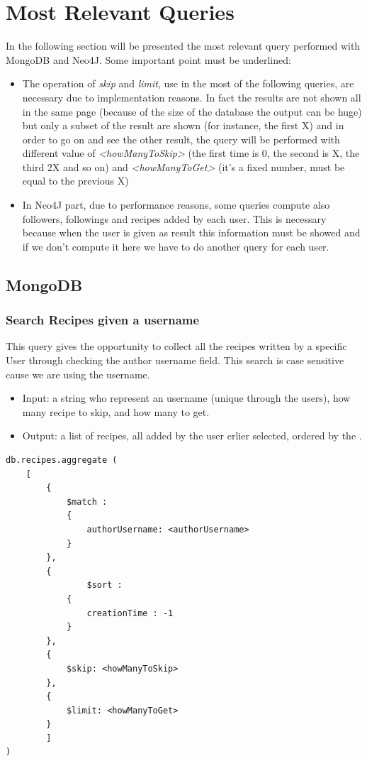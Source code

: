 \documentclass[a4paper]{report}
\begin{document}
\section{Most Relevant Queries}
In the following section will be presented the most relevant query performed with MongoDB and Neo4J. 
\noindent Some important point must be underlined:
\begin{itemize}
	\item The operation of \emph{skip} and \emph{limit}, use in the most of the following queries, are necessary due  to implementation reasons. In fact the results are not shown all in the same page (because of the size of the database the output can be huge) but only a subset of the result are shown (for instance, the first X) and in order to go on and see the other result, the query will be performed with different value of \emph{<howManyToSkip>} (the first time is 0, the second is X, the third 2X and so on) and \emph{<howManyToGet>} (it's a fixed number, must be equal to the previous X)
	\item In Neo4J part, due to performance reasons, some queries compute also followers, followings and recipes added by each user. This is necessary because when the user is given as result this information must be showed and if we don't compute it here we have to do another query for each user.
\end{itemize}

\subsection{MongoDB}

\subsubsection{Search Recipes given a username}

This query gives the opportunity to collect all the recipes written by a specific User through checking the author username field. This search is case sensitive cause we are using the username.
\begin{itemize}
	\item Input: a string who represent an username (unique through the users), how many recipe to skip, and how many to get.
	\item Output: a list of recipes, all added by the user erlier selected, ordered by the .
\end{itemize}
\lstset{ language=C++}
\begin{lstlisting}
db.recipes.aggregate (
	[
		{ 
			$match : 
			{ 
				authorUsername: <authorUsername>
			}  
		},
		{ 
				$sort : 
			{ 
				creationTime : -1 
			} 
		},
		{ 
			$skip: <howManyToSkip> 
		},
		{ 
			$limit: <howManyToGet> 
		}	
		]
)
\end{lstlisting}
\end{document}
